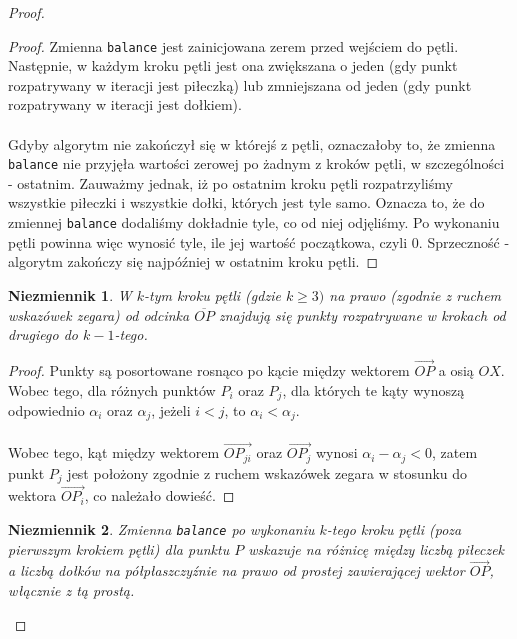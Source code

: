 \documentclass[10pt,a4paper]{article}
\newtheorem{invariant}{Niezmiennik}
\begin{document}
\begin{proof}
\begin{addmargin}[1.25em]{0em}
			\begin{proof}
				Zmienna \texttt{balance} jest zainicjowana zerem przed wejściem do pętli. Następnie, w każdym kroku pętli jest ona zwiększana o jeden (gdy punkt rozpatrywany w iteracji jest piłeczką) lub zmniejszana od jeden (gdy punkt rozpatrywany w iteracji jest dołkiem). \\~\\
				Gdyby algorytm nie zakończył się w którejś z pętli, oznaczałoby to, że zmienna \texttt{balance} nie przyjęła wartości zerowej po żadnym z kroków pętli, w szczególności - ostatnim. Zauważmy jednak, iż po ostatnim kroku pętli rozpatrzyliśmy wszystkie piłeczki i wszystkie dołki, których jest tyle samo. Oznacza to, że do zmiennej \texttt{balance} dodaliśmy dokładnie tyle, co od niej odjęliśmy. Po wykonaniu pętli powinna więc wynosić tyle, ile jej wartość początkowa, czyli $0$. Sprzeczność - algorytm zakończy się najpóźniej w ostatnim kroku pętli. 
			\end{proof}
			
			\vspace{1em}
			
			\begin{invariant} \label{invariant:3}
				W $k$-tym kroku pętli (gdzie $k \geq 3)$ na prawo (zgodnie z ruchem wskazówek zegara) od odcinka $\overline{OP}$ znajdują się punkty rozpatrywane w krokach od drugiego do $k-1$-tego.
			\end{invariant}
			
			\begin{proof}
				Punkty są posortowane rosnąco po kącie między wektorem $\overrightarrow{OP}$ a osią $OX$.  Wobec tego, dla różnych punktów $P_{i}$ oraz $P_{j}$, dla których te kąty wynoszą odpowiednio $\alpha_{i}$ oraz $\alpha_{j}$, jeżeli $i < j$, to $\alpha_{i} < \alpha_{j}$. \\~\\
				Wobec tego, kąt między wektorem $\overrightarrow{OP_{ji}}$ oraz $\overrightarrow{OP_{j}}$ wynosi $\alpha_{i} - \alpha_{j} < 0$, zatem punkt $P_{j}$ jest położony zgodnie z ruchem wskazówek zegara w stosunku do wektora $\overrightarrow{OP_{i}}$, co należało dowieść.
			\end{proof}
		
			\vspace{1em}
			
			\begin{invariant} \label{invariant:4}
				Zmienna \texttt{balance} po wykonaniu $k$-tego kroku pętli (poza pierwszym krokiem pętli) dla punktu $P$ wskazuje na różnicę między liczbą piłeczek a liczbą dołków na półpłaszczyźnie na prawo od prostej zawierającej wektor $\overrightarrow{OP}$, włącznie z tą prostą.
			\end{invariant}
			

\end{addmargin}
\end{proof}
\end{document}
